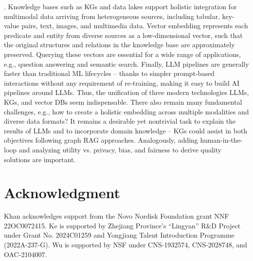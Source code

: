 \documentclass{sig-alternate-10pt}
\newcommand{\spara}[1]{\smallskip\noindent{\bf #1}}
\begin{document}
\spara{Unifying LLMs+KGs+Vector DBs}.
Knowledge bases such as KGs and data lakes support holistic integration for multimodal
data arriving from heterogeneous sources, including tabular, key-value pairs, text, images, and multimedia data. Vector embedding represents each predicate and entity from diverse sources as a low-dimensional vector,
such that the original structures and relations in the knowledge base are approximately preserved.
Querying these vectors are essential for a wide range of applications, e.g., question answering and
semantic search.
Finally, LLM pipelines are generally faster than traditional ML lifecycles --
thanks to simpler prompt-based interactions without any requirement of re-training, making it easy to build AI pipelines around LLMs. Thus, the unification of three modern technologies LLMs, KGs, and vector DBs seem indispensable.
There also remain many fundamental challenges, e.g.,  how to create a holistic embedding across multiple modalities and diverse data formats?
It remains a desirable yet nontrivial task to explain the results of LLMs and to incorporate domain knowledge -- KGs could assist in both objectives following graph RAG approaches. Analogously, adding human-in-the-loop and analyzing utility vs. privacy, bias, and fairness to derive quality solutions are important.

\section{Acknowledgment}
\label{sec:ack}

\medskip
\medskip

Khan acknowledges support from the Novo Nordisk Foundation grant NNF 22OC0072415. Ke is supported by Zhejiang Province's ``Lingyan'' R\&D Project under Grant No. 2024C01259 and Yongjiang Talent Introduction Programme (2022A-237-G). Wu is supported by NSF under CNS-1932574, CNS-2028748, and OAC-2104007.

\balance


\begin{small}


\end{small}
\end{document}
